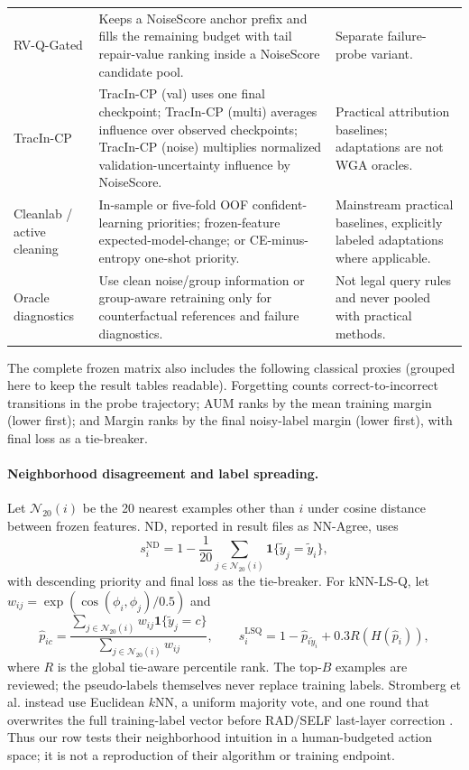 \documentclass{article}
\begin{document}
\begin{table}[H]
\begin{tabular}{p{}p{}p{}}
RV-Q-Gated & Keeps a NoiseScore anchor prefix and fills the remaining budget with tail repair-value ranking inside a NoiseScore candidate pool. & Separate failure-probe variant. \\
TracIn-CP & TracIn-CP (val) uses one final checkpoint; TracIn-CP (multi) averages influence over observed checkpoints; TracIn-CP (noise) multiplies normalized validation-uncertainty influence by NoiseScore. & Practical attribution baselines; adaptations are not WGA oracles. \\
Cleanlab / active cleaning & In-sample or five-fold OOF confident-learning priorities; frozen-feature expected-model-change; or CE-minus-entropy one-shot priority. & Mainstream practical baselines, explicitly labeled adaptations where applicable. \\
Oracle diagnostics & Use clean noise/group information or group-aware retraining only for counterfactual references and failure diagnostics. & Not legal query rules and never pooled with practical methods. \\
\bottomrule
\end{tabular}
\end{table}

The complete frozen matrix also includes the following classical proxies (grouped
here to keep the result tables readable).
Forgetting counts correct-to-incorrect transitions in the probe trajectory;
AUM ranks by the mean training margin (lower first); and Margin ranks by the
final noisy-label margin (lower first), with final loss as a tie-breaker.

\paragraph{Neighborhood disagreement and label spreading.}
Let $\mathcal N_{20}(i)$ be the 20 nearest examples other than $i$ under cosine
distance between frozen features. ND, reported in result files as NN-Agree,
uses
\begin{equation}
 s_i^{\mathrm{ND}}=1-\frac1{20}\sum_{j\in\mathcal N_{20}(i)}
 \mathbf 1\{\tilde y_j=\tilde y_i\},
 \label{eq:nd}
\end{equation}
with descending priority and final loss as the tie-breaker. For kNN-LS-Q, let
$w_{ij}=\exp(\cos(\phi_i,\phi_j)/0.5)$ and
\begin{equation}
 \hat p_{ic}=\frac{\sum_{j\in\mathcal N_{20}(i)}w_{ij}
 \mathbf 1\{\tilde y_j=c\}}{\sum_{j\in\mathcal N_{20}(i)}w_{ij}},\qquad
 s_i^{\mathrm{LSQ}}=1-\hat p_{i\tilde y_i}
 +0.3R\!\left(H(\hat p_i)\right),
 \label{eq:lsq}
\end{equation}
where $R$ is the global tie-aware percentile rank. The top-$B$ examples are
reviewed; the pseudo-labels themselves never replace training labels.
Stromberg et al. instead use Euclidean $k$NN, a uniform majority vote, and one
round that overwrites the full training-label vector before RAD/SELF
last-layer correction \citep{stromberg2024enhancing}. Thus our row tests their
neighborhood intuition in a human-budgeted action space; it is not a reproduction
of their algorithm or training endpoint.
\end{document}
